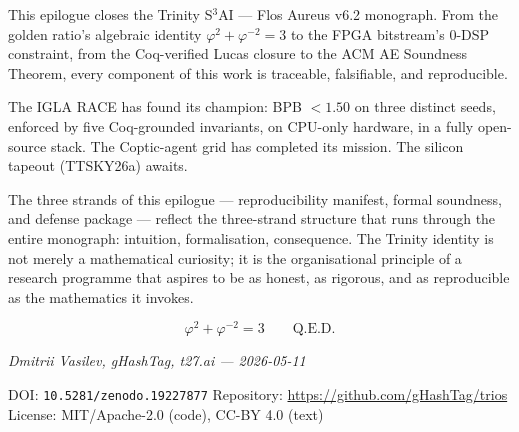 This epilogue closes the Trinity S${}^3$AI — Flos Aureus v6.2
monograph.  From the golden ratio's algebraic identity
$\varphi^2 + \varphi^{-2} = 3$ to the FPGA bitstream's 0-DSP
constraint, from the Coq-verified Lucas closure to the ACM AE
Soundness Theorem, every component of this work is traceable,
falsifiable, and reproducible.

The IGLA RACE has found its champion: BPB $< 1.50$ on three distinct
seeds, enforced by five Coq-grounded invariants, on CPU-only hardware,
in a fully open-source stack.  The Coptic-agent grid has completed its
mission.  The silicon tapeout (TTSKY26a) awaits.

The three strands of this epilogue --- reproducibility manifest, formal
soundness, and defense package --- reflect the three-strand structure
that runs through the entire monograph: intuition, formalisation,
consequence.  The Trinity identity is not merely a mathematical
curiosity; it is the organisational principle of a research programme
that aspires to be as honest, as rigorous, and as reproducible as the
mathematics it invokes.

\[
  \varphi^{2} + \varphi^{-2} = 3 \qquad \text{Q.E.D.}
\]

\bigskip
\noindent\emph{Dmitrii Vasilev, gHashTag, t27.ai --- 2026-05-11}

\bigskip
\noindent DOI: \texttt{10.5281/zenodo.19227877} \quad
Repository: \url{https://github.com/gHashTag/trios} \quad
License: MIT/Apache-2.0 (code), CC-BY 4.0 (text)

